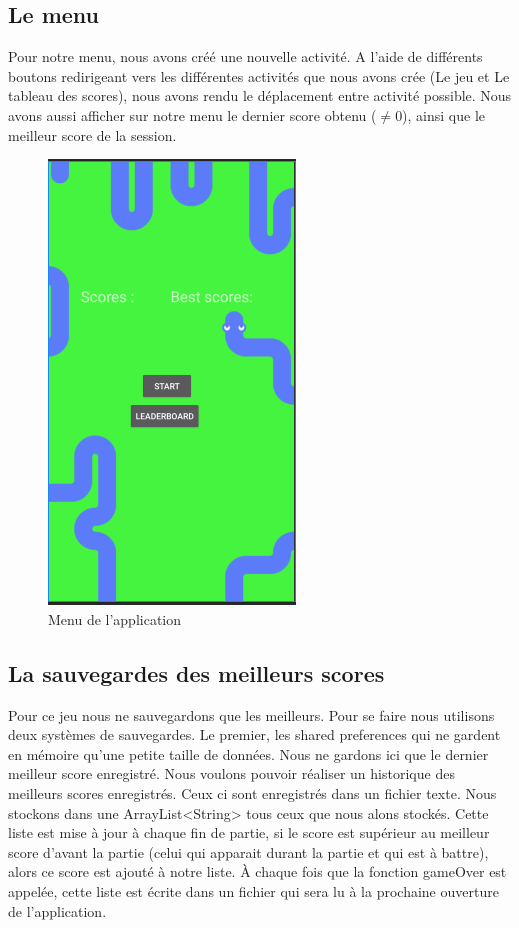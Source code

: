 \documentclass{article}
\begin{document}
\subsection{Le menu}
Pour notre menu, nous avons créé une nouvelle activité. A l'aide de différents boutons redirigeant vers les différentes activités que nous avons crée (Le jeu et Le tableau des scores), nous avons rendu le déplacement entre activité possible. Nous avons aussi afficher sur notre menu le dernier score obtenu ($\ne$0), ainsi que le meilleur score de la session.
\begin{figure}[H]
    \centering
    \includegraphics[scale=0.4]{Menu.png}
    \caption{Menu de l'application}
    \label{fig:menu}
\end{figure}

\subsection{La sauvegardes des meilleurs scores}
Pour ce jeu nous ne sauvegardons que les meilleurs. Pour se faire nous utilisons deux systèmes de sauvegardes. Le premier, les shared preferences qui ne gardent en mémoire qu'une petite taille de données. Nous ne gardons ici que le dernier meilleur score enregistré. Nous voulons pouvoir réaliser un historique des meilleurs scores enregistrés. Ceux ci sont enregistrés dans un fichier texte. Nous stockons dans une ArrayList<String> tous ceux que nous alons stockés. Cette liste est mise à jour à chaque fin de partie, si le score est supérieur au meilleur score d'avant la partie (celui qui apparait durant la partie et qui est à battre), alors ce score est ajouté à notre liste. \`A chaque fois que la fonction gameOver est appelée, cette liste est écrite dans un fichier qui sera lu à la prochaine ouverture de l'application.
\end{document}
